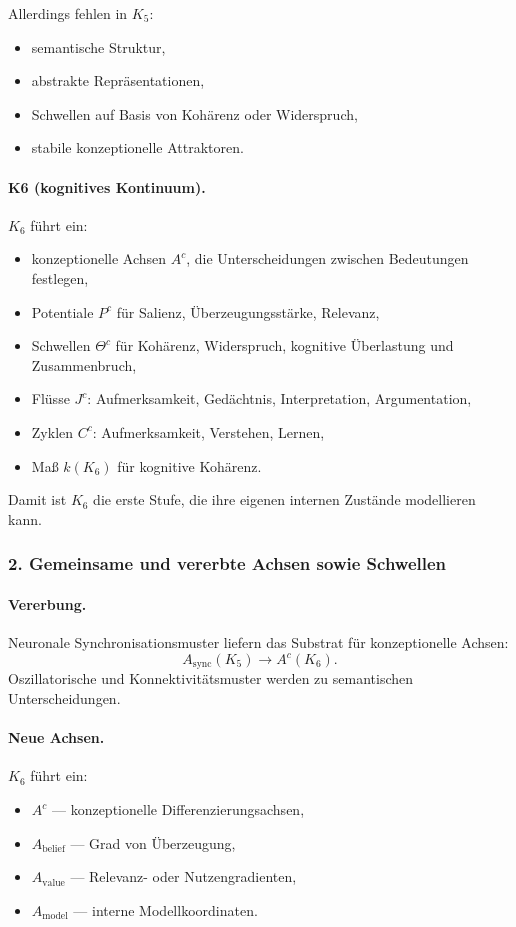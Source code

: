 Allerdings fehlen in $K_5$:
\begin{itemize}
  \item semantische Struktur,
  \item abstrakte Repräsentationen,
  \item Schwellen auf Basis von Kohärenz oder Widerspruch,
  \item stabile konzeptionelle Attraktoren.
\end{itemize}

\paragraph{K6 (kognitives Kontinuum).}
$K_6$ führt ein:
\begin{itemize}
  \item konzeptionelle Achsen $A^{c}$, die Unterscheidungen zwischen Bedeutungen
        festlegen,
  \item Potentiale $P^{c}$ für Salienz, Überzeugungsstärke, Relevanz,
  \item Schwellen $\Theta^{c}$ für Kohärenz, Widerspruch,
        kognitive Überlastung und Zusammenbruch,
  \item Flüsse $J^{c}$: Aufmerksamkeit, Gedächtnis, Interpretation, Argumentation,
  \item Zyklen $C^{c}$: Aufmerksamkeit, Verstehen, Lernen,
  \item Maß $k(K_6)$ für kognitive Kohärenz.
\end{itemize}

Damit ist $K_6$ die erste Stufe, die ihre eigenen internen Zustände modellieren
kann.

\subsubsection{2. Gemeinsame und vererbte Achsen sowie Schwellen}

\paragraph{Vererbung.}
Neuronale Synchronisationsmuster liefern das Substrat für konzeptionelle Achsen:
\[
A_{\mathrm{sync}}(K_5) \rightarrow A^{c}(K_6).
\]
Oszillatorische und Konnektivitätsmuster werden zu semantischen Unterscheidungen.

\paragraph{Neue Achsen.}
$K_6$ führt ein:
\begin{itemize}
  \item $A^{c}$ — konzeptionelle Differenzierungsachsen,
  \item $A_{\mathrm{belief}}$ — Grad von Überzeugung,
  \item $A_{\mathrm{value}}$ — Relevanz- oder Nutzengradienten,
  \item $A_{\mathrm{model}}$ — interne Modellkoordinaten.
\end{itemize}

